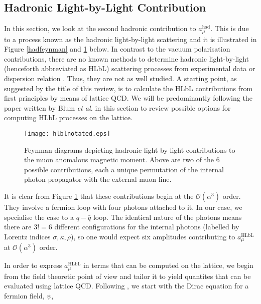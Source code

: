 \documentclass{article}
\numberwithin{equation}{section} %
\begin{document}


\subsection{Hadronic Light-by-Light Contribution}

In this section, we look at the second hadronic contribution to $a_\mu^\mathrm{had}$. This is due to a process known as the hadronic light-by-light scattering and it is illustrated in Figure \ref{hadfeynman} and \ref{hadlbl} below. In contrast to the vacuum polarisation contributions, there are no known methods to determine hadronic light-by-light (henceforth abbreviated as HLbL) scattering processes from experimental data or dispersion relation \cite{blum}. Thus, they are not as well studied. A starting point, as suggested by the title of this review, is to calculate the HLbL contributions from first principles by means of lattice QCD. We will be predominantly following the paper written by Blum \textit{et al.}\cite{blum} in this section to review possible options for computing HLbL processes on the lattice.

\begin{figure}[t]
    \centering
    \texttt{[image: hlblnotated.eps]}%
    \caption{Feynman diagrams depicting hadronic light-by-light contributions to the muon anomalous magnetic moment. Above are two of the 6 possible contributions, each a unique permutation of the internal photon propagator with the external muon line.}%
    \label{hadlbl}%
\end{figure}


It is clear from Figure \ref{hadlbl} that these contributions begin at the $\mathcal{O}(\alpha^3)$ order. They involve a fermion loop with four photons attached to it\cite{lehnerg2}. In our case, we specialise the case to a $q-\bar{q}$ loop. The identical nature of the photons means there are $3!=6$ different configurations for the internal photons (labelled by Lorentz indices $\sigma, \kappa, \rho$), so one would expect six amplitudes contributing to $a_\mu^\mathrm{HLbL}$ at $\mathcal{O}(\alpha^3)$ order.

In order to express $a_\mu^\mathrm{HLbL}$ in terms that can be computed on the lattice, we begin from the field theoretic point of view and tailor it to yield quantites that can be evaluated using lattice QCD. Following \cite{zee}, we start with the Dirac equation for a fermion field, $\psi$,
\end{document}
